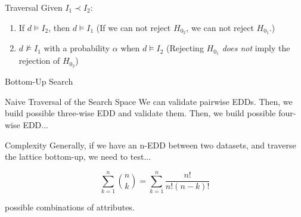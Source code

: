 \documentclass[10pt]{beamer}
\begin{document}
\begin{frame}{Traversal}
    Given $I_1 \prec I_2$:
    
    \begin{enumerate}
        \item If $d \models I_2$, then $d \models I_1$ (If we can not reject $H_{0_2}$, we can not reject $H_{0_1}$.)
        \item $d \not\models I_1$ with a probability $\alpha$ when $d \models I_2$
            (Rejecting $H_{0_1}$ \emph{does not} imply the rejection of $H_{0_2}$)
    \end{enumerate}


\end{frame}

\begin{frame}{Bottom-Up Search}
    \begin{block}{Naive Traversal of the Search Space}
        \smallskip
        We can validate pairwise EDDs. Then, we build possible three-wise EDD and validate them.
        Then, we build possible four-wise EDD...
    \end{block}
        
    \begin{alertblock}{Complexity}
    \smallskip
    Generally, if we have an n-EDD between two datasets, and traverse the lattice bottom-up, we need
    to test...
    
    \begin{equation*}
        \sum_{k=1}^{n}{\binom{n}{k}} = \sum_{k=1}^{n} \frac{n!}{n!(n - k)!}
    \end{equation*}
    
    possible combinations of attributes.
    \end{alertblock}
\end{frame}
\end{document}
